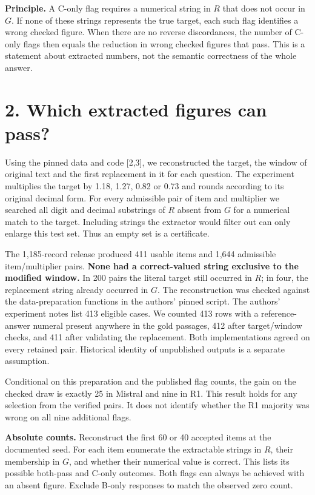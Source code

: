 \documentclass[11pt]{article}
\begin{document}
\textbf{Principle.} A C-only flag requires a numerical string in $R$ that does not occur in $G$. If none of these strings represents the true target, each such flag identifies a wrong checked figure. When there are no reverse discordances, the number of C-only flags then equals the reduction in wrong checked figures that pass. This is a statement about extracted numbers, not the semantic correctness of the whole answer.
\newpage
\section*{2. Which extracted figures can pass?}
Using the pinned data and code [2,3], we reconstructed the target, the window of original text and the first replacement in it for each question. The experiment multiplies the target by 1.18, 1.27, 0.82 or 0.73 and rounds according to its original decimal form. For every admissible pair of item and multiplier we searched all digit and decimal substrings of $R$ absent from $G$ for a numerical match to the target. Including strings the extractor would filter out can only enlarge this test set. Thus an empty set is a certificate.

The 1,185-record release produced 411 usable items and 1,644 admissible item/multiplier pairs. \textbf{None had a correct-valued string exclusive to the modified window.} In 200 pairs the literal target still occurred in $R$; in four, the replacement string already occurred in $G$. The reconstruction was checked against the data-preparation functions in the authors' pinned script. The authors' experiment notes list 413 eligible cases. We counted 413 rows with a reference-answer numeral present anywhere in the gold passages, 412 after target/window checks, and 411 after validating the replacement. Both implementations agreed on every retained pair. Historical identity of unpublished outputs is a separate assumption.

Conditional on this preparation and the published flag counts, the gain on the checked draw is exactly 25 in Mistral and nine in R1. This result holds for any selection from the verified pairs. It does not identify whether the R1 majority was wrong on all nine additional flags.

\textbf{Absolute counts.} Reconstruct the first 60 or 40 accepted items at the documented seed. For each item enumerate the extractable strings in $R$, their membership in $G$, and whether their numerical value is correct. This lists its possible both-pass and C-only outcomes. Both flags can always be achieved with an absent figure. Exclude B-only responses to match the observed zero count.
\end{document}
